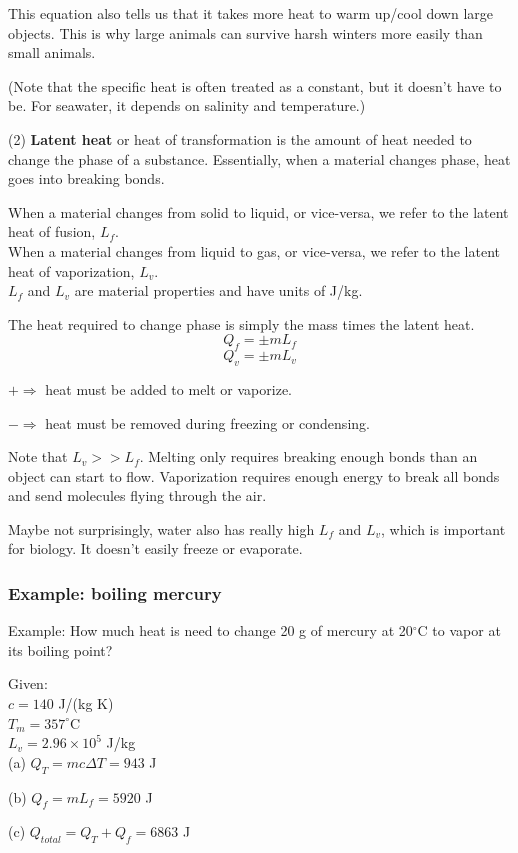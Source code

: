 This equation also tells us that it takes more heat to warm up/cool down large objects. This is why large animals can survive harsh winters more easily than small animals.

(Note that the specific heat is often treated as a constant, but it doesn't have to be. For seawater, it depends on salinity and temperature.)
\bigskip

(2) \textbf{Latent heat} or heat of transformation is the amount of heat needed to change the phase of a substance. Essentially, when a material changes phase, heat goes into breaking bonds.

When a material changes from solid to liquid, or vice-versa, we refer to the latent heat of fusion, $L_f$.\\

When a material changes from liquid to gas, or vice-versa, we refer to the latent heat of vaporization, $L_v$.\\

$L_f$ and $L_v$ are material properties and have units of J/kg.

The heat required to change phase is simply the mass times the latent heat.
$$Q_f=\pm mL_f$$
$$Q_v=\pm mL_v$$

$+\Rightarrow$ heat must be added to melt or vaporize.

$-\Rightarrow$ heat must be removed during freezing or condensing.

Note that $L_v>>L_f$. Melting only requires breaking enough bonds than an object can start to flow. Vaporization requires enough energy to break all bonds and send molecules flying through the air.

Maybe not surprisingly, water also has really high $L_f$ and $L_v$, which is important for biology. It doesn't easily freeze or evaporate.

\subsubsection{Example: boiling mercury}
Example: How much heat is need to change 20 g of mercury at 20$^\circ$C to vapor at its boiling point?

Given:\\
$c=140$ J/(kg K)\\
$T_m=357^\circ$C\\
$L_v=2.96\times 10^5$ J/kg\\

(a) $Q_T=mc\Delta{T}=943$ J

(b) $Q_f=mL_f=5920$ J

(c) $Q_{total}=Q_T+Q_f=6863$ J

\clearpage
